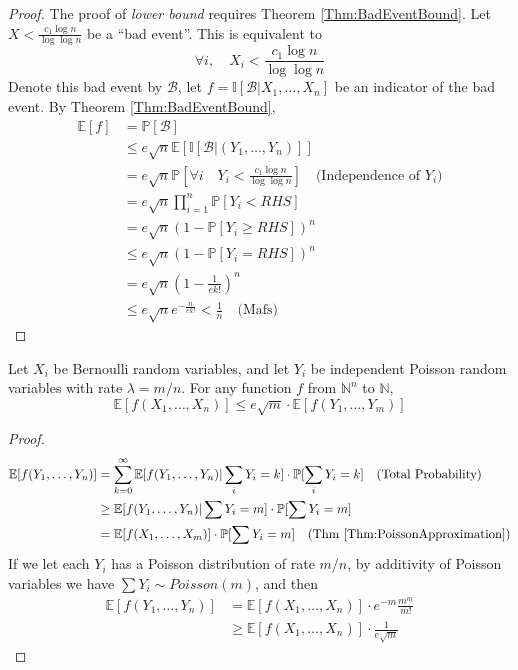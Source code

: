 \begin{proof}
            The proof of \emph{lower bound} requires Theorem \ref{Thm:BadEventBound}. Let $X < \frac{c_1\log n}{\log\log n}$ be a ``bad event''. This is equivalent to
            \[ \forall i, \quad X_i < \frac{c_1\log n}{\log\log n} \]
            Denote this bad event by $\mathcal{B}$, let $f = \mathbb{I}[\mathcal{B}|X_1,\dots,X_n]$ be an indicator of the bad event. By Theorem \ref{Thm:BadEventBound},
            \begin{align*}
                \mathbb{E}[f] &= \mathbb{P}[\mathcal{B}]\\
                &\le e\sqrt{n} \mathbb{E}[\mathbb{I}[\mathcal{B}|(Y_1,\dots,Y_n)]]\\
                &= e\sqrt{n} \mathbb{P}[\forall i \quad Y_i < \frac{c_1\log n}{\log\log n}] \quad \text{(Independence of $Y_i$)}\\
                &= e\sqrt{n}\prod_{i=1}^n \mathbb{P}[Y_i < RHS]\\
                &= e\sqrt{n}(1-\mathbb{P}[Y_i \ge RHS])^n\\
                &\le e\sqrt{n}(1-\mathbb{P}[Y_i = RHS])^n\\
                &= e\sqrt{n}\left(1-\frac{1}{ek!}\right)^n\\
                &\le e\sqrt{n} e^{-\frac{n}{ek!}} < \frac{1}{n} \quad \text{(Mafs)}
            \end{align*}
        \end{proof}
        \begin{theorem}\label{Thm:BadEventBound}
            Let $X_i$ be Bernoulli random variables, and let $Y_i$ be independent Poisson random variables with rate $\lambda = m/n$. For any function $f$ from $\mathbb{N}^n$ to $\mathbb{N}$,
            \[ \mathbb{E}[f(X_1, \dots, X_n)] \le e\sqrt{m}\cdot\mathbb{E}[f(Y_1,\dots,Y_m)] \]
        \end{theorem}
        \begin{proof}
            \begin{align*}
                \mathbb{E}[f(Y_1,\dots,Y_n)] &= \sum_{k=0}^{\infty}\mathbb{E}[f(Y_1,\dots,Y_n) | \sum_i Y_i = k] \cdot \mathbb{P}[\sum_i Y_i = k] \quad \text{(Total Probability)}\\
                &\ge \mathbb{E}[f(Y_1,\dots,Y_n)|\sum Y_i = m]\cdot \mathbb{P}[\sum Y_i = m]\\
                &= \mathbb{E}[f(X_1,\dots,X_m)]\cdot\mathbb{P}[\sum Y_i = m] \quad \text{(Thm \ref{Thm:PoissonApproximation})}
            \end{align*}
            If we let each $Y_i$ has a Poisson distribution of rate $m/n$, by additivity of Poisson variables we have $\sum Y_i \sim Poisson(m)$, and then
            \begin{align*}
                \mathbb{E}[f(Y_1,\dots,Y_n)] &= \mathbb{E}[f(X_1,\dots,X_n)]\cdot e^{-m}\frac{m^m}{m!}\\
                &\ge \mathbb{E}[f(X_1,\dots,X_n)]\cdot\frac{1}{e\sqrt{m}}
            \end{align*}
        \end{proof}
